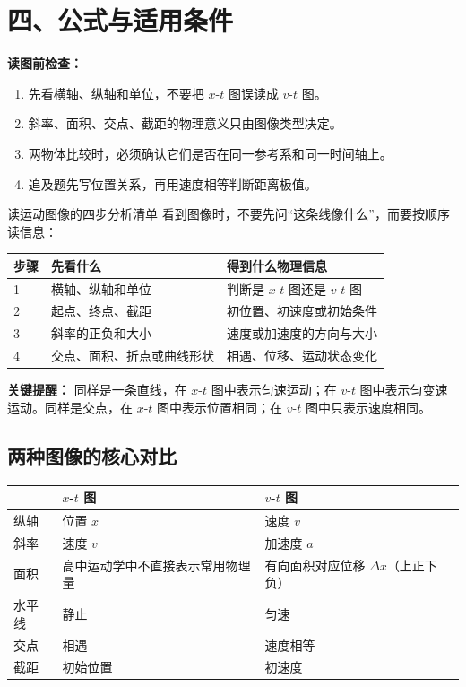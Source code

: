 \section*{四、公式与适用条件}

\textbf{读图前检查：}
\begin{enumerate}
  \item 先看横轴、纵轴和单位，不要把 $x$-$t$ 图误读成 $v$-$t$ 图。
  \item 斜率、面积、交点、截距的物理意义只由图像类型决定。
  \item 两物体比较时，必须确认它们是否在同一参考系和同一时间轴上。
  \item 追及题先写位置关系，再用速度相等判断距离极值。
\end{enumerate}

\begin{learningbox}{读运动图像的四步分析清单}
看到图像时，不要先问“这条线像什么”，而要按顺序读信息：

\begin{center}
\begin{tabular}{lll}
\toprule
步骤 & 先看什么 & 得到什么物理信息 \\
\midrule
1 & 横轴、纵轴和单位 & 判断是 $x$-$t$ 图还是 $v$-$t$ 图 \\
2 & 起点、终点、截距 & 初位置、初速度或初始条件 \\
3 & 斜率的正负和大小 & 速度或加速度的方向与大小 \\
4 & 交点、面积、折点或曲线形状 & 相遇、位移、运动状态变化 \\
\bottomrule
\end{tabular}
\end{center}

\textbf{关键提醒：} 同样是一条直线，在 $x$-$t$ 图中表示匀速运动；在 $v$-$t$ 图中表示匀变速运动。同样是交点，在 $x$-$t$ 图中表示位置相同；在 $v$-$t$ 图中只表示速度相同。
\end{learningbox}

\subsection*{两种图像的核心对比}

\begin{center}
\begin{tabular}{lll}
\toprule
 & $x$-$t$ 图 & $v$-$t$ 图 \\
\midrule
纵轴 & 位置 $x$ & 速度 $v$ \\
斜率 & 速度 $v$ & 加速度 $a$ \\
面积 & 高中运动学中不直接表示常用物理量 & 有向面积对应位移 $\Delta x$（上正下负） \\
水平线 & 静止 & 匀速 \\
交点 & 相遇 & 速度相等 \\
截距 & 初始位置 & 初速度 \\
\bottomrule
\end{tabular}
\end{center}

